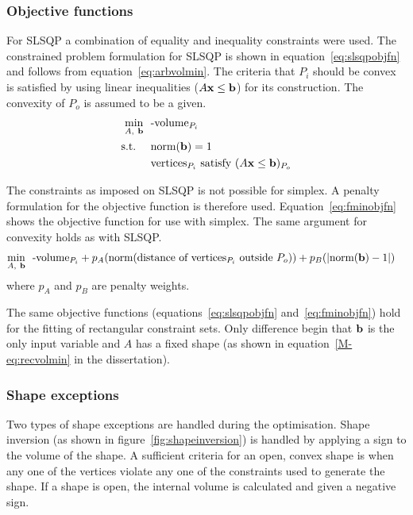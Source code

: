 \subsubsection{Objective functions}
For SLSQP a combination of equality and inequality constraints were used.
The constrained problem formulation for SLSQP is shown in equation~\ref{eq:slsqpobjfn} and follows from equation~\ref{eq:arbvolmin}.
The criteria that $P_i$ should be convex is satisfied by using linear inequalities ($A{\bf {x}} \leq {\bf {b}}$) for its construction.
The convexity of $P_o$ is assumed to be a given.
\begin{align}
  \label{eq:slsqpobjfn}
    \min_{A,~{\bf {b}}}~~&\text{-volume}_{P_i}\\
    \text{s.t.}~~~~ &\text{norm}({\bf {b}}) = 1 \notag \\
                    &\text{vertices}_{P_i} \text{~satisfy~} (A{\bf {x}}\leq{\bf {b}})_{P_o} \notag  
\end{align}

The constraints as imposed on SLSQP is not possible for simplex.
A penalty formulation for the objective function is therefore used.
Equation~\ref{eq:fminobjfn} shows the objective function for use with simplex.
The same argument for convexity holds as with SLSQP.
\begin{align}
  \label{eq:fminobjfn}
    \min_{A,~{\bf {b}}}~~&\text{-volume}_{P_i} + p_A(\text{norm}(\text{distance of vertices$_{P_i}$ outside}~P_o)) + p_B(|\text{norm}({\bf {b}}) - 1|)  
\end{align}
where $p_A$ and $p_B$ are penalty weights.

The same objective functions (equations~\ref{eq:slsqpobjfn} and~\ref{eq:fminobjfn}) hold for the fitting of rectangular constraint sets.
Only difference begin that ${\bf {b}}$ is the only input variable and $A$ has a fixed shape (as shown in equation~\ref{M-eq:recvolmin} in the dissertation).

\subsubsection{Shape exceptions}
Two types of shape exceptions are handled during the optimisation.
Shape inversion (as shown in figure~\ref{fig:shapeinversion}) is handled by applying a sign to the volume of the shape.
A sufficient criteria for an open, convex shape is when any one of the vertices violate any one of the constraints used to generate the shape.
If a shape is open, the internal volume is calculated and given a negative sign.


